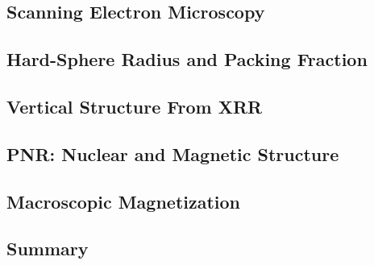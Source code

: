 \documentclass[\main/dresen_thesis.tex]{subfiles}
\renewcommand{\thisPath}{\main/chapters/looselyPackedNS/structure}
\begin{document}
  \subsection{Scanning Electron Microscopy}
  
    \FloatBarrier

  \subsection{Hard-Sphere Radius and Packing Fraction}
  
    \FloatBarrier

  \subsection{Vertical Structure From XRR}
  
    \FloatBarrier

  \subsection{PNR: Nuclear and Magnetic Structure}
  
    \FloatBarrier

  \subsection{Macroscopic Magnetization}
  
    \FloatBarrier

  \subsection{Summary}
  
    \FloatBarrier
\end{document}
